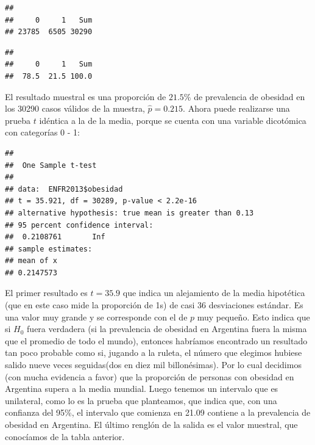 \documentclass[]{book}
\newenvironment{Shaded}{\begin{snugshade}}{\end{snugshade}}
\newcommand{\DataTypeTok}[1]{\textcolor[rgb]{0.13,0.29,0.53}{#1}}
\newcommand{\DecValTok}[1]{\textcolor[rgb]{0.00,0.00,0.81}{#1}}
\newcommand{\FloatTok}[1]{\textcolor[rgb]{0.00,0.00,0.81}{#1}}
\newcommand{\KeywordTok}[1]{\textcolor[rgb]{0.13,0.29,0.53}{\textbf{#1}}}
\newcommand{\NormalTok}[1]{#1}
\newcommand{\OperatorTok}[1]{\textcolor[rgb]{0.81,0.36,0.00}{\textbf{#1}}}
\newcommand{\StringTok}[1]{\textcolor[rgb]{0.31,0.60,0.02}{#1}}
\begin{document}
\begin{verbatim}
## 
##     0     1   Sum 
## 23785  6505 30290
\end{verbatim}

\begin{Shaded}
\end{Shaded}

\begin{verbatim}
## 
##     0     1   Sum 
##  78.5  21.5 100.0
\end{verbatim}

El resultado muestral es una proporción de \(21.5\%\) de prevalencia de obesidad en los 30290 casos válidos de la muestra, \(\widehat{p}=0.215\). Ahora puede realizarse una prueba \(t\) idéntica a la de la media, porque se cuenta con una variable dicotómica con categorías 0 - 1:

\begin{Shaded}
\end{Shaded}

\begin{verbatim}
## 
##  One Sample t-test
## 
## data:  ENFR2013$obesidad
## t = 35.921, df = 30289, p-value < 2.2e-16
## alternative hypothesis: true mean is greater than 0.13
## 95 percent confidence interval:
##  0.2108761       Inf
## sample estimates:
## mean of x 
## 0.2147573
\end{verbatim}

El primer resultado es \(t=35.9\) que indica un alejamiento de la media hipotética (que en este caso mide la proporción de 1s) de casi 36 desviaciones estándar. Es una valor muy grande y se corresponde con el de \(p\) muy pequeño. Esto indica que si \(H_{0}\) fuera verdadera (si la prevalencia de obesidad en Argentina fuera la misma que el promedio de todo el mundo), entonces habríamos encontrado un resultado tan poco probable como si, jugando a la ruleta, el número que elegimos hubiese salido nueve veces seguidas(dos en diez mil billonésimas). Por lo cual decidimos (con mucha evidencia a favor) que la proporción de personas con obesidad en Argentina supera a la media mundial.
Luego tenemos un intervalo que es unilateral, como lo es la prueba que planteamos, que indica que, con una confianza del 95\%, el intervalo que comienza en 21.09 contiene a la prevalencia de obesidad en Argentina.
El último renglón de la salida es el valor muestral, que conocíamos de la tabla anterior.
\end{document}
